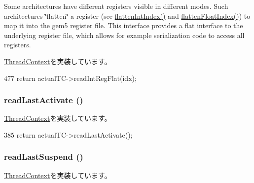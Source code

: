 Some architectures have different registers visible in different modes. Such architectures \char`\"{}flatten\char`\"{} a register (see \hyperlink{classProxyThreadContext_aa529f2d70520c578e3e29b3bf1a66312}{flattenIntIndex()} and \hyperlink{classProxyThreadContext_ab9ea3f8f1a21df875c7273c7377dfac1}{flattenFloatIndex()}) to map it into the gem5 register file. This interface provides a flat interface to the underlying register file, which allows for example serialization code to access all registers. 

\hyperlink{classThreadContext_aebc14d23082a9095e0f641a6c5c8b083}{ThreadContext}を実装しています。


\begin{DoxyCode}
477     { return actualTC->readIntRegFlat(idx); }
\end{DoxyCode}
\hypertarget{classProxyThreadContext_afaa8f9eb8d809cccd31829ba793a433a}{
\subsubsection[{readLastActivate}]{ readLastActivate ()}}
\label{classProxyThreadContext_afaa8f9eb8d809cccd31829ba793a433a}


\hyperlink{classThreadContext_a99574c7f076a26875232079962cbe522}{ThreadContext}を実装しています。


\begin{DoxyCode}
385 { return actualTC->readLastActivate(); }
\end{DoxyCode}
\hypertarget{classProxyThreadContext_a7d0b0631c7087d361f6ae11379c06b15}{
\subsubsection[{readLastSuspend}]{ readLastSuspend ()}}
\label{classProxyThreadContext_a7d0b0631c7087d361f6ae11379c06b15}


\hyperlink{classThreadContext_affe95ad96bb334a8132f9c69291f39a4}{ThreadContext}を実装しています。


